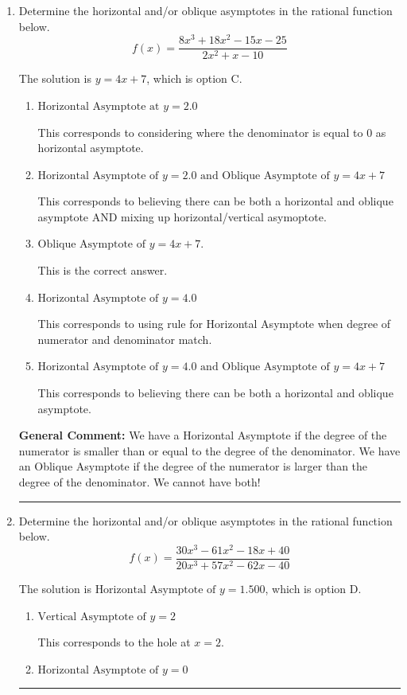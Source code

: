 \documentclass{extbook}[14pt]
\newcommand{\litem}[1]{\item #1

\rule{\textwidth}{0.4pt}}
\begin{document}
\begin{enumerate}\litem{
Determine the horizontal and/or oblique asymptotes in the rational function below.
\[ f(x) = \frac{8x^{3} +18 x^{2} -15 x -25}{2x^{2} +x -10} \]

The solution is \( y = 4x + 7 \), which is option C.\begin{enumerate}[label=\Alph*.]
\item \( \text{Horizontal Asymptote at } y = 2.0 \)

This corresponds to considering where the denominator is equal to 0 as horizontal asymptote.
\item \( \text{Horizontal Asymptote of } y = 2.0 \text{ and Oblique Asymptote of } y = 4x + 7 \)

This corresponds to believing there can be both a horizontal and oblique asymptote AND mixing up horizontal/vertical asymoptote.
\item \( \text{Oblique Asymptote of } y = 4x + 7. \)

This is the correct answer.
\item \( \text{Horizontal Asymptote of } y = 4.0  \)

This corresponds to using rule for Horizontal Asymptote when degree of numerator and denominator match.
\item \( \text{Horizontal Asymptote of } y = 4.0 \text{ and Oblique Asymptote of } y = 4x + 7 \)

This corresponds to believing there can be both a horizontal and oblique asymptote.
\end{enumerate}

\textbf{General Comment:} We have a Horizontal Asymptote if the degree of the numerator is smaller than or equal to the degree of the denominator. We have an Oblique Asymptote if the degree of the numerator is larger than the degree of the denominator. We cannot have both!
}
\litem{
Determine the horizontal and/or oblique asymptotes in the rational function below.
\[ f(x) = \frac{30x^{3} -61 x^{2} -18 x + 40}{20x^{3} +57 x^{2} -62 x -40} \]

The solution is \( \text{Horizontal Asymptote of } y = 1.500  \), which is option D.\begin{enumerate}[label=\Alph*.]
\item \( \text{Vertical Asymptote of } y = 2  \)

This corresponds to the hole at $x = 2$.
\item \( \text{Horizontal Asymptote of } y = 0  \)


\end{enumerate}}
\end{enumerate}
\end{document}
